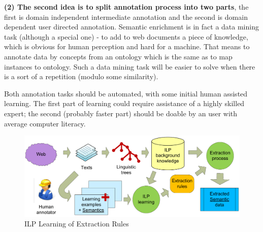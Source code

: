\documentclass{www2009-submission}
\begin{document}




\textbf{(2) The second idea is to split annotation process into two parts}, the first is domain independent intermediate annotation and the second is domain dependent user directed annotation. Semantic enrichment is in fact a data mining task (although a special one) - to add to web documents a piece of knowledge, which is obvious for human perception and hard for a machine. That means to annotate data by concepts from an ontology which is the same as to map instances to ontology. Such a data mining task will be easier to solve when there is a sort of a repetition (modulo some similarity).\par 
Both annotation tasks should be automated, with some initial human assisted learning. The first part of learning could require assistance of a highly skilled expert; the second (probably faster part) should be doable by an user with average computer literacy. \par



\begin{figure}[b!]
\centering
\includegraphics[width=\hsize]{img/DedVoj_ILP}
\caption{ILP Learning of Extraction Rules}
\label{img:DedVoj_ILP}
\end{figure}
\end{document}
